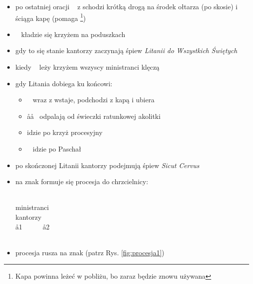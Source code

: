 \begin{itemize}
	\item po ostatniej oracji \ii~ z  schodzi krótką drogą na środek ołtarza
	      (po skosie) i ściąga kapę (pomaga  \footnote{Kapa powinna leżeć w
		      pobliżu, bo zaraz będzie znowu używana})
	\item \ii~ kładzie się krzyżem na poduszkach
	\item gdy to się stanie kantorzy zaczynają śpiew
	      \textit{Litanii do Wszystkich Świętych}
	\item kiedy \ii~ leży krzyżem wszyscy ministranci klęczą
	\item gdy Litania dobiega ku końcowi:
	      \begin{itemize}
		      \item \ii~ wraz z  wstaje,  podchodzi z kapą i ubiera \ii
		      \item \aa\aa~ odpalają od świeczki ratunkowej akolitki
		      \item {} idzie po krzyż procesyjny
		      \item \mm~ idzie po Paschał
	      \end{itemize}
	\item po skończonej Litanii kantorzy podejmują śpiew \textit{Sicut Cervus}
	\item na znak  formuje się procesja do chrzcielnicy:
	      \begin{center}
		      ~~~\ii~~~ \smallskip\\
		      ministranci \smallskip\\
		      kantorzy \smallskip\\
		      \aa1~~~~~~\aa2 \smallskip\\
		      ~~~\mm \smallskip\\
		      \downarrow
	      \end{center}
	\item procesja rusza na znak  (patrz Rys. \ref{fig:procesja1})
\end{itemize}
